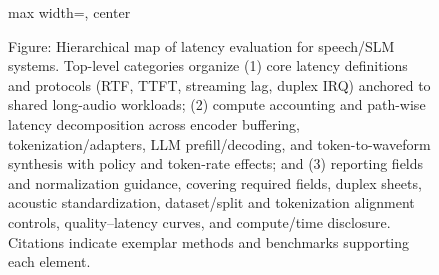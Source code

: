 \begin{figure}[h]
\begin{adjustbox}{max width=\textwidth, center}
\begin{tikzpicture}
\end{tikzpicture}
\end{adjustbox}

\caption{Figure: Hierarchical map of latency evaluation for speech/SLM systems. Top-level categories organize (1) core latency definitions and protocols (RTF, TTFT, streaming lag, duplex IRQ) anchored to shared long-audio workloads; (2) compute accounting and path-wise latency decomposition across encoder buffering, tokenization/adapters, LLM prefill/decoding, and token-to-waveform synthesis with policy and token-rate effects; and (3) reporting fields and normalization guidance, covering required fields, duplex sheets, acoustic standardization, dataset/split and tokenization alignment controls, quality–latency curves, and compute/time disclosure. Citations indicate exemplar methods and benchmarks supporting each element.}
\label{fig:tiny_tree_figure_9}

\end{figure}